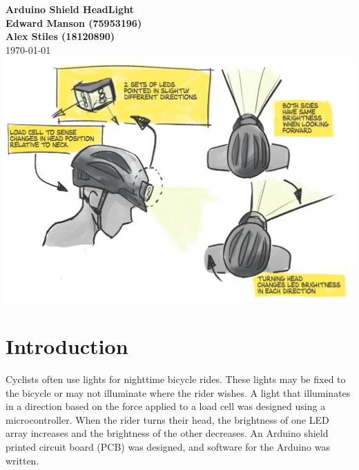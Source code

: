 \documentclass[twoside]{article}
\begin{document}

\begin{titlingpage}
    {\centering
    \vspace*{3cm}
    {\LARGE\textbf{Arduino Shield HeadLight}\\}
    \vspace{1cm}
    {\textbf{Edward Manson (75953196)}\\}
    {\textbf{Alex Stiles (18120890)}\\}
    \vspace{1cm}
    {\today}
    \vfill
    \noindent
    \includegraphics[width=0.75\linewidth]{headlamp-project-concept.png}
    \vfill}
\end{titlingpage}


{\hypersetup{linkcolor=black}
\tableofcontents
\listoffigures
\listoftables
\lstlistoflistings}
\newpage


\section{Introduction}
    Cyclists often use lights for nighttime bicycle rides. These lights may be fixed to the bicycle or may not illuminate where the rider wishes. A light that illuminates in a direction based on the force applied to a load cell was designed using a microcontroller. When the rider turns their head, the brightness of one LED array increases and the brightness of the other decreases. An Arduino shield printed circuit board (PCB) was designed, and software for the Arduino was written.
\end{document}
